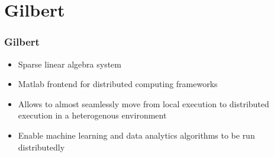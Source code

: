 \section{Gilbert}

\begin{frame}
	\frametitle{Gilbert}
	\begin{itemize}
		\item Sparse linear algebra system
		\item Matlab frontend for distributed computing frameworks
		\item Allows to almost seamlessly move from local execution to distributed execution in a heterogenous environment
		\item Enable machine learning and data analytics algorithms to be run distributedly
	\end{itemize}
\end{frame}